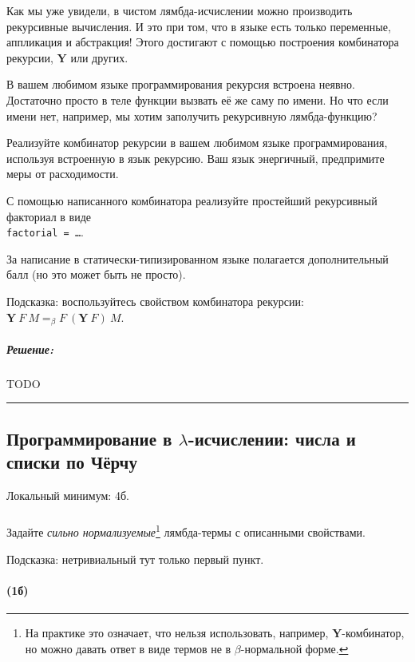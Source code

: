 \documentclass{article}
\newenvironment{proof}{\subparagraph{\hspace{-1em}Решение:\newline}}{\par\noindent\rule{\textwidth}{0.4pt}}
\newcommand{\comb}[1]{\mathbf{#1}}
\newcommand{\eqbeta}{=_\beta}
\begin{document}
    Как мы уже увидели, в чистом лямбда-исчислении можно производить рекурсивные вычисления.
    И это при том, что в языке есть только переменные, аппликация и абстракция!
    Этого достигают с помощью построения комбинатора рекурсии, $\comb{Y}$ или других.

    В вашем любимом языке программирования рекурсия встроена неявно.
    Достаточно просто в теле функции вызвать её же саму по имени.
    Но что если имени нет, например, мы хотим заполучить рекурсивную лямбда-функцию?

    Реализуйте комбинатор рекурсии в вашем любимом языке программирования, используя встроенную в язык рекурсию.
    Ваш язык энергичный, предпримите меры от расходимости.

    С помощью написанного комбинатора реализуйте простейший рекурсивный факториал в виде \\ \texttt{factorial = \ldots}.

    За написание в статически-типизированном языке полагается дополнительный балл (но это может быть не просто).

    Подсказка: воспользуйтесь свойством комбинатора рекурсии: $\comb{Y}~F~M \eqbeta F~(\comb{Y}~F)~M$.

    \begin{proof}
        TODO %
    \end{proof}

    \subsection{Программирование в $\lambda$-исчислении: числа и списки по Чёрчу}

    Локальный минимум: 4б.

    \subsubsection{}

    Задайте \emph{сильно нормализуемые}\footnote{На практике это означает, что нельзя использовать, например, $\comb{Y}$-комбинатор, но можно давать ответ в виде термов не в $\beta$-нормальной форме.} лямбда-термы с описанными свойствами.

    Подсказка: нетривиальный тут только первый пункт.

    \paragraph{(1б)}
\end{document}
